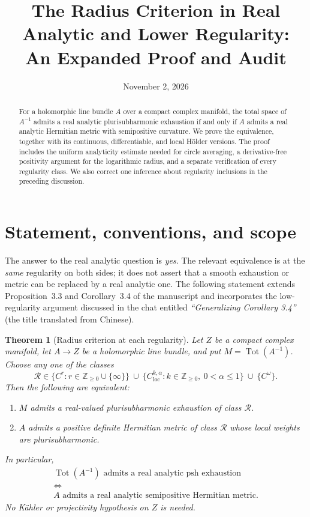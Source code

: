 \documentclass[11pt]{amsart}
\title[The real analytic radius criterion]{The Radius Criterion in Real Analytic
and Lower Regularity:\\ An Expanded Proof and Audit}
\date{November 2, 2026}
\newtheorem{theorem}{Theorem}[section]
\theoremstyle{definition}
\theoremstyle{remark}
\numberwithin{equation}{section}
\newcommand{\Tot}{\operatorname{Tot}}
\newcommand{\loc}{\mathrm{loc}}
\newcommand{\Reg}{\mathcal R}
\begin{document}
\begin{abstract}
For a holomorphic line bundle $A$ over a compact complex manifold,
the total space of $A^{-1}$ admits a real analytic plurisubharmonic
exhaustion if and only if $A$ admits a real analytic Hermitian metric
with semipositive curvature. We prove the equivalence, together with
its continuous, differentiable, and local H\"older versions. The proof
includes the uniform analyticity estimate needed for circle averaging,
a derivative-free positivity argument for the logarithmic radius,
and a separate verification of every regularity class. We also correct
one inference about regularity inclusions in the preceding discussion.
\end{abstract}
\maketitle
\tableofcontents

\section{Statement, conventions, and scope}

The answer to the real analytic question is \emph{yes}. The relevant
equivalence is at the \emph{same} regularity on both sides; it does not
assert that a smooth exhaustion or metric can be replaced by a real
analytic one. The following statement extends Proposition~3.3 and
Corollary~3.4 of the manuscript \cite{CX} and incorporates the
low-regularity argument discussed in the chat entitled
\emph{``Generalizing Corollary 3.4''} (the title translated from Chinese).

\begin{theorem}[Radius criterion at each regularity]\label{thm:main}
Let $Z$ be a compact complex manifold, let $A\to Z$ be a holomorphic
line bundle, and put $M=\Tot(A^{-1})$. Choose any one of the classes
\begin{equation}\label{eq:classes}
\Reg\in\bigl\{C^r:r\in\mathbb Z_{\ge0}\cup\{\infty\}\bigr\}
\ \cup\ \bigl\{C^{k,\alpha}_{\loc}:k\in\mathbb Z_{\ge0},\ 0<\alpha\le1\bigr\}
\ \cup\ \{C^\omega\}.
\end{equation}
Then the following are equivalent:
\begin{enumerate}[label=\textup{(\roman*)},leftmargin=*]
\item $M$ admits a real-valued plurisubharmonic exhaustion of class $\Reg$.
\item $A$ admits a positive definite Hermitian metric of class $\Reg$
whose local weights are plurisubharmonic.
\end{enumerate}
In particular,
\begin{equation}\label{eq:analytic-equivalence}
\begin{gathered}
\Tot(A^{-1})\text{ admits a real analytic psh exhaustion}
\\\Longleftrightarrow\\
A\text{ admits a real analytic semipositive Hermitian metric}.
\end{gathered}
\end{equation}
No K\"ahler or projectivity hypothesis on $Z$ is needed.
\end{theorem}
\end{document}
